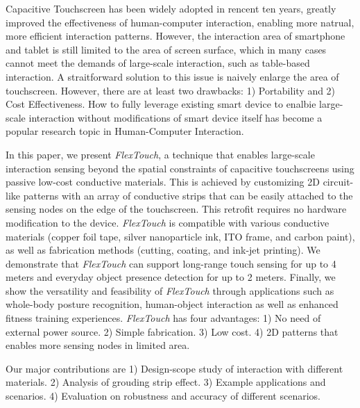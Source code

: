 \begin{eabstract}
  Capacitive Touchscreen has been widely adopted in rencent ten years, greatly improved the effectiveness of human-computer interaction, enabling more natrual, more efficient interaction patterns. However, the interaction area of smartphone and tablet is still limited to the area of screen surface, which in many cases cannot meet the demands of large-scale interaction, such as table-based interaction. A straitforward solution to this issue is naively enlarge the area of touchscreen. However, there are at least two drawbacks: 1) Portability and 2) Cost Effectiveness. How to fully leverage existing smart device to enalbie large-scale interaction without modifications of smart device itself has become a popular research topic in Human-Computer Interaction.

  In this paper, we present \textit{FlexTouch}, a technique that enables large-scale interaction sensing beyond the spatial constraints of capacitive touchscreens using passive low-cost conductive materials. This is achieved by customizing 2D circuit-like patterns with an array of conductive strips that can be easily attached to the sensing nodes on the edge of the touchscreen. This retrofit requires no hardware modification to the device. \textit{FlexTouch} is compatible with various conductive materials (copper foil tape, silver nanoparticle ink, ITO frame, and carbon paint), as well as fabrication methods (cutting, coating, and ink-jet printing). We demonstrate that \textit{FlexTouch} can support long-range touch sensing for up to 4 meters and everyday object presence detection for up to 2 meters. Finally, we show the versatility and feasibility of \textit{FlexTouch} through applications such as whole-body posture recognition, human-object interaction as well as enhanced fitness training experiences. \textit{FlexTouch} has four advantages: 1) No need of external power source. 2) Simple fabrication. 3) Low cost. 4) 2D patterns that enables more sensing nodes in limited area.  
  
  Our major contributions are 1) Design-scope study of interaction with different materials. 2) Analysis of grouding strip effect. 3) Example applications and scenarios. 4) Evaluation on robustness and accuracy of different scenarios.
\end{eabstract}

